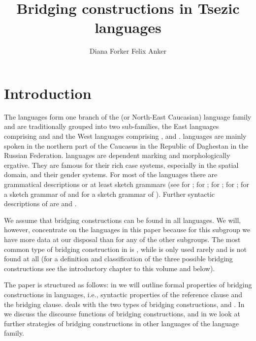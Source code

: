\documentclass[output=paper]{LSP/langsci}
\author{
   Diana Forker\affiliation{University of Jena}\lastand
   Felix Anker\affiliation{University of Bamberg}
}
\title{Bridging constructions in Tsezic languages}
\begin{document}
\label{ch:4}

\section{Introduction} 
\label{sec:Introduction}
The  languages form one branch of the  (or North-East Caucasian) language family and are traditionally grouped into two sub-families, the East  languages comprising  and  and the West  languages comprising ,  and .  languages are mainly spoken in the northern part of the Caucasus in the Republic of Daghestan in the Russian Federation.  languages are dependent marking and morphologically ergative. They are famous for their rich case systems, especially in the spatial domain, and their gender systems. For most of the  languages there are grammatical descriptions or at least sketch grammars (see \citealt{Forker.2013a} for ; \citealt{Khalilova.2009} for ; \citealt{vandenBerg.1995} for ;  \citealt{Comrie.et.al.2015} for ; \citealt{Kibrik.Testelets.2004} for a sketch grammar of  and \citealt{Alekseev.Radzhabov.2004} for a sketch grammar of ). Further syntactic descriptions of  are \citet{Radjabov.1999} and \citet{Polinsky.InPreparation}.

We assume that bridging constructions can be found in all  languages. We will, however, concentrate on the  languages in this paper because for this subgroup we have more data at our disposal than for any of the other subgroups. The most common type of bridging construction in  is , while  is only used rarely and  is not found at all (for a definition and classification of the three possible bridging constructions see the introductory chapter to this volume and  below).

The paper is structured as follows: in  we will outline formal properties of bridging constructions in  languages, i.e., syntactic properties of the reference clause and the bridging clause.  deals with the two types of bridging constructions,  and . In  we discuss the discourse functions of bridging constructions, and in  we look at further strategies of bridging constructions in other languages of the  language family. 
\end{document}
